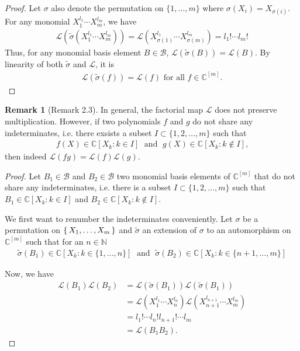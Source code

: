 \documentclass[a4paper]{article}
\theoremstyle{definition}
\newtheorem*{remark}{Remark}
\newcommand{\set}[1]{\mleft\{\, #1 \,\mright\}}
\begin{document}
\begin{proof}
    Let \(\sigma\) also denote the permutation on \(\{1, \ldots, m\}\) where \(\sigma(X_i) = X_{\sigma(i)}\). For any monomial \(X_1^{l_1} \cdots X_m^{l_m}\), we have
    \begin{align*}
        \mathcal{L}\left(\tilde{\sigma}\left(X_1^{l_1} \cdots X_m^{l_m}\right)\right) = 
        \mathcal{L} \left(X_{\sigma(1)}^{l_1} \cdots X_{\sigma(m)}^{l_m}\right) =
        l_1 ! \cdots l_m! 
    \end{align*}
    Thus, for any monomial basis element \(B \in \mathcal{B}\), \(\mathcal{L}(\tilde{\sigma}(B)) = \mathcal{L}(B)\). By linearity of both \(\tilde{\sigma}\) and \(\mathcal{L}\), it is
    \begin{align*}
        \mathcal{L}(\tilde{\sigma}(f)) = \mathcal{L}(f) \text{ for all } f \in \mathbb{C}^{[m]} \text{.}
    \end{align*}
\end{proof}
%
\begin{remark}[Remark 2.3]
    In general, the factorial map \(\mathcal{L}\) does not preserve multiplication. However, if two polynomials \(f\) and \(g\) do not share any indeterminates, i.e. there exsists a subset \(I \subset \{1, 2, \ldots, m\}\) such that
    \begin{align*}
        f(X) \in \mathbb{C}[X_k : k \in I] \; \text{ and } \; g(X) \in \mathbb{C}[X_k : k \not\in I] \text{,}
    \end{align*}
    then indeed \(\mathcal{L}(fg) = \mathcal{L}(f)\mathcal{L}(g)\).
\end{remark}
%
\begin{proof}
    Let \(B_1 \in \mathcal{B}\) and \(B_2 \in \mathcal{B}\) two monomial basis elements of \(\mathbb{C}^{[m]}\) that do not share any indeterminates, i.e. there is a subset \(I \subset \{1, 2, \ldots, m\}\) such that \(B_1 \in \mathbb{C}[X_k : k \in I]\) and \(B_2 \in \mathbb{C}[X_k : k \not\in I]\).
    
    We first want to renumber the indeterminates conveniently. Let \(\sigma\) be a permutation on \(\set{X_1, \ldots, X_m}\) and \(\tilde{\sigma}\) an extension of \(\sigma\) to an automorphism on \(\mathbb{C}^{[m]}\) such that for an \(n \in \mathbb{N}\)
    \begin{align*}
        \tilde{\sigma}(B_1) \in \mathbb{C}[X_k : k \in \{1, \ldots, n\}] \; \text{ and } \; \tilde{\sigma}(B_2) \in \mathbb{C}[X_k : k \in \{n + 1, \ldots, m\}]
    \end{align*}
    
    Now, we have
    \begin{align*}
        \mathcal{L}(B_1)\mathcal{L}(B_2) &= \mathcal{L}(\tilde{\sigma}(B_1))\mathcal{L}(\tilde{\sigma}(B_1)) \\
        &= \mathcal{L}(X_1^{l_1} \cdots X_n^{l_n})\mathcal{L}(X_{n+1}^{l_{n+1}} \cdots X_m^{l_m}) \\
        &= l_1 ! \cdots l_n ! l_{n+1}! \cdots l_m \\
        &= \mathcal{L} (B_1 B_2) \text{.}
    \end{align*}
\end{proof}
\end{document}

